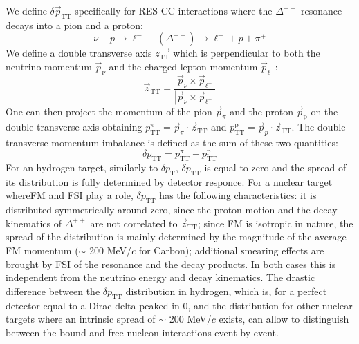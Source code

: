 We define $\delta \Vec{p}_\text{TT}$ specifically for RES CC interactions where the $\Delta^{++}$ resonance decays into a pion and a proton:
\begin{equation}
\label{eq:REStopology}
    \nu+p\rightarrow \ell^-+(\Delta^{++})\rightarrow \ell^-+p+\pi^+
\end{equation}
We define a double transverse axis $\Vec{z_\text{TT}}$ which is perpendicular to both the neutrino momentum $\Vec{p}_\nu$ and the charged lepton momentum $\Vec{p}_{\ell^-}$:
\begin{equation}
\label{eq:ztt}
\Vec{z}_\text{TT}=\frac{\Vec{p}_\nu\times\Vec{p}_{\ell^-}}{|\Vec{p}_\nu\times\Vec{p}_{\ell^-}|}
\end{equation}
One can then project the momentum of the pion $\Vec{p}_{\pi}$ and the proton $\Vec{p}_\text{p}$ on the double transverse axis obtaining $p^{\pi}_\text{TT}=\Vec{p}_{\pi}\cdot\Vec{z}_\text{TT}$ and $p^\text{p}_\text{TT}=\Vec{p}_{p}\cdot\Vec{z}_\text{TT}$. The double transverse momentum imbalance is defined as the sum of these two quantities: 
\begin{equation}
\label{eq:dpTT}
    \delta p_\text{TT}=p^{\pi}_\text{TT}+p^\text{p}_\text{TT}
\end{equation}
For an hydrogen target, similarly to $\delta p_\text{T}$, $\delta p_\text{TT}$ is equal to zero and the spread of its distribution is fully determined by detector responce. For a nuclear target whereFM and FSI play a role, $\delta p_\text{TT}$ has the following characteristics: it is distributed symmetrically around zero, since the proton motion and the decay kinematics of $\Delta^{++}$ are not correlated to $\Vec{z}_\text{TT}$; since FM is isotropic in nature, the spread of the distribution is  mainly determined by the magnitude of the average FM momentum ($\sim$ 200 MeV/$c$ for Carbon); additional smearing effects are brought by FSI of the resonance and the decay products. In both cases this is independent from the neutrino energy and decay kinematics. The drastic difference between the $\delta p_\text{TT}$ distribution in hydrogen, which is, for a perfect detector equal to a Dirac delta peaked in 0, and the distribution for other nuclear targets where an intrinsic spread of $\sim$ 200 MeV/$c$ exists, can allow to distinguish between the bound and free nucleon interactions event by event.

